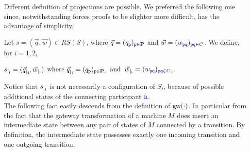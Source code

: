 Different definition of projections are possible. We preferred the following one since, notwithstanding forces proofs to be slighter more difficult, has the advantage of simplicity. 
\begin{definition}[Projections]
Let $s= (\vec{q},\vec{w})\in RS(S)$, where $\vec{q}=(q_{\mathtt{\color{blue}{ {p}}}})_{{\mathtt{\color{blue}{ {p}}}}\in\mathbf{P}}$
and $\vec{w} = (w_{{\mathtt{\color{blue}{ {p}}}}{\mathtt{\color{blue}{ {q}}}}})_{{\mathtt{\color{blue}{ {p}}}}{\mathtt{\color{blue}{ {q}}}}\in C}$. 
We define, for $i=1,2$,\\
\centerline{${s}_{\mid_{\mathbf{i}}}=({\vec{q}}_{\mid_{\mathbf{i}}},{\vec{w}}_{\mid_{\mathbf{i}}})$ \quad
where ${\vec{q}}_{\mid_{\mathbf{i}}} = (q_{\mathtt{\color{blue}{ {p}}}})_{{\mathtt{\color{blue}{ {p}}}}\in\mathbf{P}_i}$ and\ 
${\vec{w}}_{\mid_{\mathbf{i}}} =  (w_{{\mathtt{\color{blue}{ {p}}}}{\mathtt{\color{blue}{ {q}}}}})_{{\mathtt{\color{blue}{ {p}}}}{\mathtt{\color{blue}{ {q}}}}\in C_i}$.
}
\end{definition}


Notice that ${s}_{\mid_{\mathbf{i}}}$ is not necessarily a configuration of $S_i$, because of possible additional states of the connecting participant ${\mathtt{\color{blue}{ {h}}}}$.\\


The following fact easily descends from the definition of $\mathsf{gw}(\cdot)$.
In particular from the fact that the gateway transformation of a machine $M$ does insert an intermediate state
 between any pair of states of $M$ connected by a transition. By definition, the intermediate state
 possesses exactly one incoming transition and one outgoing transition. 

